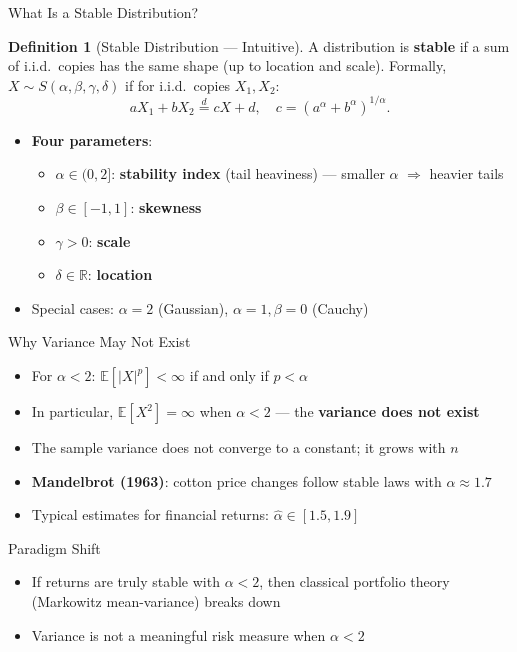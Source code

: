 \documentclass[9pt, aspectratio=169, t]{beamer}
\theoremstyle{definition}
\newtheorem{defn}{Definition}
\newcommand{\E}{\mathbb{E}}
\newcommand{\R}{\mathbb{R}}
\begin{document}
\begin{frame}{What Is a Stable Distribution?}
\begin{defn}[Stable Distribution --- Intuitive]
A distribution is \textbf{stable} if a sum of i.i.d.\ copies has the same shape (up to location and scale). Formally, $X \sim S(\alpha, \beta, \gamma, \delta)$ if for i.i.d.\ copies $X_1, X_2$:
\[
aX_1 + bX_2 \stackrel{d}{=} cX + d, \quad c = (a^\alpha + b^\alpha)^{1/\alpha}.
\]
\end{defn}

\begin{itemize}
\item \textbf{Four parameters}:
\begin{itemize}
\item $\alpha \in (0, 2]$: \textbf{stability index} (tail heaviness) --- smaller $\alpha$ $\Rightarrow$ heavier tails
\item $\beta \in [-1, 1]$: \textbf{skewness}
\item $\gamma > 0$: \textbf{scale}
\item $\delta \in \R$: \textbf{location}
\end{itemize}
\item Special cases: $\alpha = 2$ (Gaussian), $\alpha = 1, \beta = 0$ (Cauchy)
\end{itemize}
\end{frame}

\begin{frame}{Why Variance May Not Exist}
\begin{itemize}
\item For $\alpha < 2$: $\E[|X|^p] < \infty$ if and only if $p < \alpha$
\item In particular, $\E[X^2] = \infty$ when $\alpha < 2$ --- the \textbf{variance does not exist}
\item The sample variance does not converge to a constant; it grows with $n$
\item \textbf{Mandelbrot (1963)}: cotton price changes follow stable laws with $\alpha \approx 1.7$
\item Typical estimates for financial returns: $\hat{\alpha} \in [1.5, 1.9]$
\end{itemize}

\vspace{0.2cm}
\begin{alertblock}{Paradigm Shift}
\begin{itemize}
\item If returns are truly stable with $\alpha < 2$, then classical portfolio theory (Markowitz mean-variance) breaks down
\item Variance is not a meaningful risk measure when $\alpha < 2$
\end{itemize}
\end{alertblock}
\end{frame}
\end{document}
